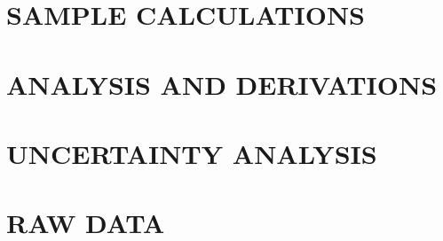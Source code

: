 \documentclass[12pt]{article}
\begin{document}
\clearpage
\begin{alphasection}
    \section{SAMPLE CALCULATIONS}\label{sec:A}
    
    \section{ANALYSIS AND DERIVATIONS}\label{sec:B}
    
    \section{UNCERTAINTY ANALYSIS}\label{sec:C}
    
    \section{RAW DATA} \label{sec:D}
    
\end{alphasection}
\end{document}
